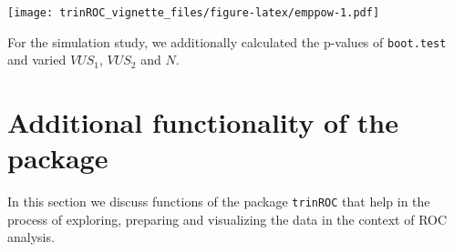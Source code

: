 \documentclass[
]{article}
\newenvironment{Shaded}{\begin{snugshade}}{\end{snugshade}}
\newcommand{\AttributeTok}[1]{\textcolor[rgb]{0.77,0.63,0.00}{#1}}
\newcommand{\DecValTok}[1]{\textcolor[rgb]{0.00,0.00,0.81}{#1}}
\newcommand{\FloatTok}[1]{\textcolor[rgb]{0.00,0.00,0.81}{#1}}
\newcommand{\FunctionTok}[1]{\textcolor[rgb]{0.00,0.00,0.00}{#1}}
\newcommand{\NormalTok}[1]{#1}
\newcommand{\OtherTok}[1]{\textcolor[rgb]{0.56,0.35,0.01}{#1}}
\newcommand{\SpecialCharTok}[1]{\textcolor[rgb]{0.00,0.00,0.00}{#1}}
\newcommand{\StringTok}[1]{\textcolor[rgb]{0.31,0.60,0.02}{#1}}
\begin{document}
\begin{Shaded}
\end{Shaded}

\texttt{[image: trinROC\_vignette\_files/figure-latex/emppow-1.pdf]}

For the simulation study, we additionally calculated the p-values of
\texttt{boot.test} and varied \(VUS_1\), \(VUS_2\) and \(N\).

\hypertarget{additional-functionality-of-the-package}{%
\section{Additional functionality of the
package}\label{additional-functionality-of-the-package}}

In this section we discuss functions of the package \texttt{trinROC}
that help in the process of exploring, preparing and visualizing the
data in the context of ROC analysis.
\end{document}
